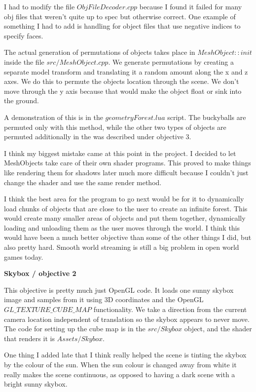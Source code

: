 \documentclass[10pt]{article}
\begin{document}
	I had to modify the file $ObjFileDecoder.cpp$ because I found it failed for many obj files that weren't quite up to spec but otherwise correct. One example of something I had to add is handling for object files that use negative indices to specify faces.
	
	The actual generation of permutations of objects takes place in $MeshObject::init$ inside the file $src/MeshObject.cpp$. We generate permutations by creating a separate model transform and translating it a random amount along the x and z axes. We do this to permute the objects location through the scene. We don't move through the y axis because that would make the object float or sink into the ground.
	
	A demonstration of this is in the $geometryForest.lua$ script. The buckyballs are permuted only with this method, while the other two types of objects are permuted additionally in the was described under objective 3.
	
	I think my biggest mistake came at this point in the project. I decided to let MeshObjects take care of their own shader programs. This proved to make things like rendering them for shadows later much more difficult because I couldn't just change the shader and use the same render method.
	
	I think the best area for the program to go next would be for it to dynamically load chunks of objects that are close to the user to create an infinite forest. This would create many smaller areas of objects and put them together, dynamically loading and unloading them as the user moves through the world. I think this would have been a much better objective than some of the other things I did, but also pretty hard. Smooth world streaming is still a big problem in open world games today.
		
	\begin{center}
		\bf Skybox / objective 2
	\end{center}	
	
	This objective is pretty much just OpenGL code. It loads one sunny skybox image and samples from it using 3D coordinates and the OpenGL $GL\_TEXTURE\_CUBE\_MAP$ functionality. We take a direction from the current camera location independent of translation so the skybox appears to never move. The code for setting up the cube map is in the $src/Skybox$ object, and the shader that renders it is $Assets/Skybox$.
	
	One thing I added late that I think really helped the scene is tinting the skybox by the colour of the sun. When the sun colour is changed away from white it really makes the scene continuous, as opposed to having a dark scene with a bright sunny skybox.
	
\end{document}
